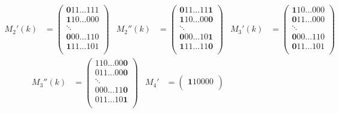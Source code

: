 \documentclass[12pt]{book}
\theoremstyle{plain}
\theoremstyle{remark}
\begin{document}

\begin{figure}[h!]
\small{
	\centering
	\begin{align*}
			M_2'(k) &= \begin{pmatrix}
				\pmb 0 1 1  \ldots 1 1 1\\
				\pmb 1  1 0  \ldots 0 0 0\\
				\ddots  \\
				\pmb 0 0 0 \ldots 1 1 0 \\
				\pmb 1 1 1 \ldots 1 0 1 \\
			\end{pmatrix}
			&
			M_2''(k) &= \begin{pmatrix}
				\pmb 0  1  1  \ldots  1 1 \pmb 1  \\
				\pmb 1  1  0  \ldots  0 0  \pmb 0 \\
				\ddots \\
				\pmb 0  0  0 \ldots  1 0 \pmb 1  \\
				\pmb 1  1  1  \ldots  1 1  \pmb 0  \\
			\end{pmatrix}	
			&
			M_3'(k) &= \begin{pmatrix}
				\pmb 1   1   0   \ldots   0   0   0 \\
				\pmb 0   1   1   \ldots   0   0   0 \\
				\ddots \\
				\pmb 0   0   0   \ldots   1   1   0 \\
				\pmb 0   1   1   \ldots   1   0   1 \\
			\end{pmatrix}
			\end{align*}
		\begin{align*}
			M_3''(k) &= \begin{pmatrix}
				1   1   0   \ldots   0   0   \pmb 0 \\
				0   1   1   \ldots   0   0   \pmb 0 \\
				\ddots \\
				0   0   0   \ldots   1   1   \pmb 0 \\
				0   1   1   \ldots   1   0   \pmb 1 \\
			\end{pmatrix}
			&
			M_4' &= \begin{pmatrix}
					\pmb 1   1   0   0   0   0 \\ 

\end{pmatrix}
\end{align*}}
\end{figure}
\end{document}
